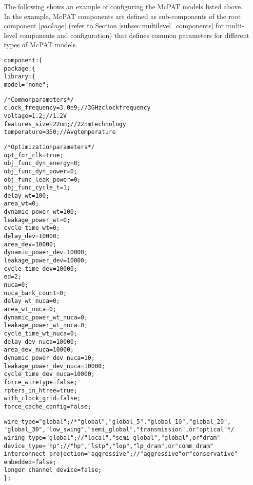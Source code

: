 \noindent
The following shows an example of configuring the McPAT models listed above. 
In the example, McPAT components are defined as sub-components of the root component $|package|$ (refer to Section \ref{subsec:multilevel_components} for multi-level components and configuration) that defines common parameters for different types of McPAT models.
{
\fontsize{10pt}{11pt}\selectfont
\begin{alltt}
component: \{
    package: \{
        library: \{
            model = "none";
            
            /* Common parameters */
            clock_frequency = 3.0e9; // 3GHz clock frequency
            voltage = 1.2; // 1.2V
            features_size = 22nm; // 22nm technology
            temperature = 350; // Avg temperature

            /* Optimization parameters */
            opt_for_clk = true;
            obj_func_dyn_energy = 0;
            obj_func_dyn_power = 0;
            obj_func_leak_power = 0;
            obj_func_cycle_t = 1;
            delay_wt = 100;
            area_wt = 0;
            dynamic_power_wt = 100;
            leakage_power_wt = 0;
            cycle_time_wt = 0;
            delay_dev = 10000;
            area_dev = 10000;
            dynamic_power_dev = 10000;
            leakage_power_dev = 10000;
            cycle_time_dev = 10000;
            ed =  2;
            nuca = 0;
            nuca_bank_count = 0;
            delay_wt_nuca = 0;
            area_wt_nuca = 0;
            dynamic_power_wt_nuca = 0;
            leakage_power_wt_nuca = 0;
            cycle_time_wt_nuca = 0;
            delay_dev_nuca = 10000;
            area_dev_nuca = 10000;
            dynamic_power_dev_nuca = 10;
            leakage_power_dev_nuca = 10000;
            cycle_time_dev_nuca = 10000;
            force_wiretype = false;
            rpters_in_htree = true;
            with_clock_grid = false;
            force_cache_config = false;
            
            wire_type = "global"; /* "global", "global_5", "global_10", "global_20", 
                        "global_30", "low_swing", "semi_global", "transmission", or "optical" */
            wiring_type = "global"; // "local", "semi_global", "global", or "dram"
            device_type = "hp"; // "hp", "lstp", "lop", "lp_dram", or "comm_dram"
            interconnect_projection = "aggressive"; // "aggressive" or "conservative"
            embedded = false;
            longer_channel_device = false;
        \};
        

\end{alltt}}

